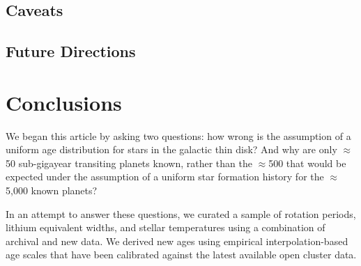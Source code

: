\documentclass[11pt,twocolumn,tighten]{aastex63}
\begin{document}


\subsection{Caveats}

\subsection{Future Directions}

%   
%   
%   
%   
%   




\section{Conclusions}
\label{sec:conclusions}

We began this article by asking two questions: how wrong is the assumption
of a uniform age distribution for stars in the galactic thin disk?
And why are only $\approx$50 sub-gigayear transiting planets
known, rather than the $\approx$500 that would be expected under the 
assumption of a uniform star formation history for
the $\approx$5{,}000 known planets?

In an attempt to answer these questions, we curated a sample of rotation
periods, lithium equivalent widths, and stellar temperatures using a combination
of archival and new data.
We derived new ages using empirical interpolation-based age scales
that have been calibrated against the latest available open cluster data.
\end{document}
